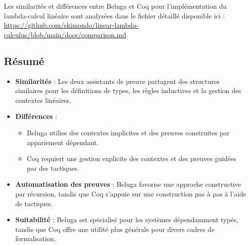 Les similarités et différences entre Beluga et Coq pour l'implémentation du lambda-calcul linéaire sont analysées dans le fichier détaillé disponible ici : \url{https://github.com/skimondo/linear-lambda-calculus/blob/main/docs/comparison.md}.

\subsection{Résumé}

\begin{itemize}
    \item \textbf{Similarités} : Les deux assistants de preuve partagent des structures similaires pour les définitions de types, les règles inductives et la gestion des contextes linéaires.
    \item \textbf{Différences} :
    \begin{itemize}
        \item Beluga utilise des contextes implicites et des preuves construites par appariement dépendant.
        \item Coq requiert une gestion explicite des contextes et des preuves guidées par des tactiques.
    \end{itemize}
    \item \textbf{Automatisation des preuves} : Beluga favorise une approche constructive par récursion, tandis que Coq s'appuie sur une construction pas à pas à l'aide de tactiques.
    \item \textbf{Suitabilité} : Beluga est spécialisé pour les systèmes dépendamment typés, tandis que Coq offre une utilité plus générale pour divers cadres de formalisation.
\end{itemize}
